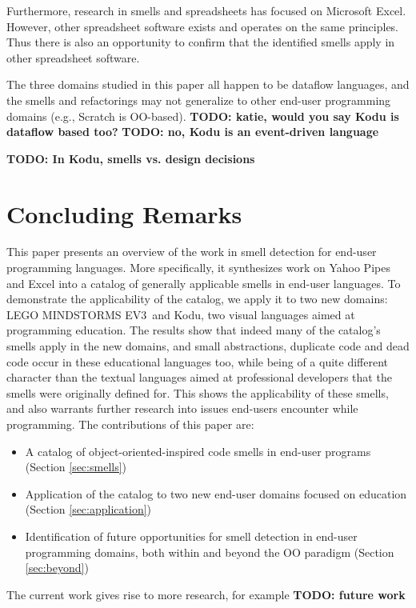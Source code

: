 \documentclass{sig-alternate}
\newcommand{\todo}[1]{\textbf{TODO: #1}}
\newcommand{\ms}{LEGO MINDSTORMS EV3}
\begin{document}
Furthermore, research in smells and spreadsheets has focused on Microsoft Excel. However, other spreadsheet software exists and operates on the same principles. Thus there is also an opportunity to confirm that the identified smells apply in other spreadsheet software.


The three domains studied in this paper all happen to be dataflow languages, and the smells and refactorings may not generalize to other end-user programming domains (e.g., Scratch is OO-based). \todo{katie, would you say Kodu is dataflow based too?} \todo{no, Kodu is an event-driven language}


\todo{In Kodu, smells vs. design decisions}

\section{Concluding Remarks}
\label{sec:conclusions}
This paper presents an overview of the work in smell detection for end-user programming languages. More specifically, it synthesizes work on Yahoo Pipes and Excel into a catalog of generally applicable smells in end-user languages. To demonstrate the applicability of the catalog, we apply it to two new domains: \ms~and Kodu, two visual languages aimed at programming education. The results show that indeed many of the catalog's smells apply in the new domains, and small abstractions, duplicate code and dead code occur in these educational languages too, while being of a quite different character than the textual languages aimed at professional developers that the smells were originally defined for. This shows the applicability of these smells, and also warrants further research into issues end-users encounter while programming. The contributions of this paper are:

\begin{itemize}
	\item A catalog of object-oriented-inspired code smells in end-user programs (Section \ref{sec:smells})
	\item Application of the catalog to two new end-user domains focused on education (Section \ref{sec:application})
	\item Identification of future opportunities for smell detection in end-user programming domains, both within and beyond the OO paradigm (Section \ref{sec:beyond})
\end{itemize}

The current work gives rise to more research, for example \todo{future work}
\end{document}
